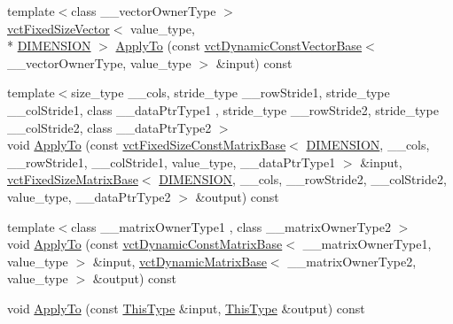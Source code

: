 \begin{DoxyCompactItemize}
\item 
{\footnotesize template$<$class \-\_\-\-\_\-vector\-Owner\-Type $>$ }\\\hyperlink{classvct_fixed_size_vector}{vct\-Fixed\-Size\-Vector}$<$ value\-\_\-type, \\*
\hyperlink{classvct_quaternion_rotation3_base_a729ac03acdd5949ecf382629e563d2a0a9417132a8a6849e18439d903ae6a1f18}{D\-I\-M\-E\-N\-S\-I\-O\-N} $>$ \hyperlink{classvct_quaternion_rotation3_base_a325b9b7a00977944710e138d9f9fa672}{Apply\-To} (const \hyperlink{classvct_dynamic_const_vector_base}{vct\-Dynamic\-Const\-Vector\-Base}$<$ \-\_\-\-\_\-vector\-Owner\-Type, value\-\_\-type $>$ \&input) const 
\item 
{\footnotesize template$<$size\-\_\-type \-\_\-\-\_\-cols, stride\-\_\-type \-\_\-\-\_\-row\-Stride1, stride\-\_\-type \-\_\-\-\_\-col\-Stride1, class \-\_\-\-\_\-data\-Ptr\-Type1 , stride\-\_\-type \-\_\-\-\_\-row\-Stride2, stride\-\_\-type \-\_\-\-\_\-col\-Stride2, class \-\_\-\-\_\-data\-Ptr\-Type2 $>$ }\\void \hyperlink{classvct_quaternion_rotation3_base_a9e7293a9906d19ad13033c32ba2a54e2}{Apply\-To} (const \hyperlink{classvct_fixed_size_const_matrix_base}{vct\-Fixed\-Size\-Const\-Matrix\-Base}$<$ \hyperlink{classvct_quaternion_rotation3_base_a729ac03acdd5949ecf382629e563d2a0a9417132a8a6849e18439d903ae6a1f18}{D\-I\-M\-E\-N\-S\-I\-O\-N}, \-\_\-\-\_\-cols, \-\_\-\-\_\-row\-Stride1, \-\_\-\-\_\-col\-Stride1, value\-\_\-type, \-\_\-\-\_\-data\-Ptr\-Type1 $>$ \&input, \hyperlink{classvct_fixed_size_matrix_base}{vct\-Fixed\-Size\-Matrix\-Base}$<$ \hyperlink{classvct_quaternion_rotation3_base_a729ac03acdd5949ecf382629e563d2a0a9417132a8a6849e18439d903ae6a1f18}{D\-I\-M\-E\-N\-S\-I\-O\-N}, \-\_\-\-\_\-cols, \-\_\-\-\_\-row\-Stride2, \-\_\-\-\_\-col\-Stride2, value\-\_\-type, \-\_\-\-\_\-data\-Ptr\-Type2 $>$ \&output) const 
\item 
{\footnotesize template$<$class \-\_\-\-\_\-matrix\-Owner\-Type1 , class \-\_\-\-\_\-matrix\-Owner\-Type2 $>$ }\\void \hyperlink{classvct_quaternion_rotation3_base_a1c2f9b5a6e94fd4fc1c29ab5e1d35802}{Apply\-To} (const \hyperlink{classvct_dynamic_const_matrix_base}{vct\-Dynamic\-Const\-Matrix\-Base}$<$ \-\_\-\-\_\-matrix\-Owner\-Type1, value\-\_\-type $>$ \&input, \hyperlink{classvct_dynamic_matrix_base}{vct\-Dynamic\-Matrix\-Base}$<$ \-\_\-\-\_\-matrix\-Owner\-Type2, value\-\_\-type $>$ \&output) const 
\item 
void \hyperlink{classvct_quaternion_rotation3_base_aca00b347c8b13aa531ee7e433a009494}{Apply\-To} (const \hyperlink{classvct_quaternion_base_af28efdc38acf89acb7a67afada11408c}{This\-Type} \&input, \hyperlink{classvct_quaternion_base_af28efdc38acf89acb7a67afada11408c}{This\-Type} \&output) const 

\end{DoxyCompactItemize}
